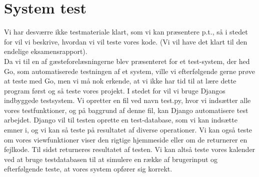 \documentclass[12pt]{article}   %
\begin{document}
\section{System test}
Vi har desværre ikke testmateriale klart, som vi kan præsentere p.t., så i stedet for vil vi beskrive, hvordan vi vil teste vores kode. (Vi vil have det klart til den endelige eksamensrapport). \\
Da vi til en af gæsteforelæsningerne blev præsenteret for et test-system, der hed Go, som automatiserede testningen af et system, ville vi efterfølgende gerne prøve at teste med Go, men vi må nok erkende, at vi ikke har tid til at lære dette program først og så teste vores projekt. I stedet for vil vi bruge Djangos indbyggede testsystem. Vi opretter en fil ved navn test.py, hvor vi indsætter alle vores testfunktioner, og på baggrund af denne fil, kan Django automatisere test arbejdet. Django vil til testen oprette en test-database, som vi kan indsætte emner i, og vi kan så teste på resultatet af diverse operationer. Vi kan også teste om vores viewfunktioner viser den rigtige hjemmeside eller om de returnerer en fejlkode. Til sidst returneres resultatet af testen. Vi kan altså teste vores kalender ved at bruge testdatabasen til at simulere en række af brugerinput og efterfølgende teste, at vores system opfører sig korrekt.  
\end{document}
